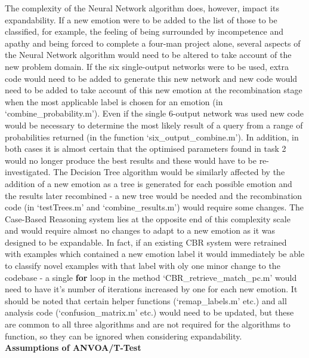 \documentclass[a4paper]{article}
\begin{document}
The complexity of the Neural Network algorithm does, however, impact its expandability. If a new emotion were to be added to the list of
those to be classified, for example, the feeling of being surrounded by incompetence and apathy and being forced to complete a four-man project
alone, several aspects of the Neural Network algorithm would need to be altered to take account of the new problem domain. If the six single-output
networks were to be used, extra code would need to be added to generate this new network and new code would need to be added to take account of
this new emotion at the recombination stage when the most applicable label is chosen for an emotion (in `combine\_probability.m').
Even if the single 6-output network was used new code would be necessary to determine the most likely result of a query from a range of
probabilities returned (in the function `six\_output\_combine.m'). In addition, in both cases it is almost certain that the optimised parameters
found in task 2 would no longer produce the best results and these would have to be re-investigated. The Decision Tree algorithm would be
similarly affected by the addition of a new emotion as a tree is generated for each possible emotion and the results later recombined - a new tree
would be needed and the recombination code (in `testTrees.m' and `combine\_results.m') would require some changes. The Case-Based Reasoning system
lies at the opposite end of this complexity scale and would require almost no changes to adapt to a new emotion as it was designed to be expandable.
In fact, if an existing CBR system were retrained with examples which contained a new emotion label it would immediately be able to classify novel
examples with that label with oly one minor change to the codebase - a single {\bf for} loop in the method `CBR\_retrieve\_match\_pc.m' would need
to have it's number of iterations increased by one for each new emotion. It should be noted that certain helper functions (`remap\_labels.m' etc.)
and all analysis code (`confusion\_matrix.m' etc.) would need to be updated, but these are common to all three algorithms and are not required
for the algorithms to function, so they can be ignored when considering expandability.\\

{\bf Assumptions of ANVOA/T-Test}\\
 
\end{document}
